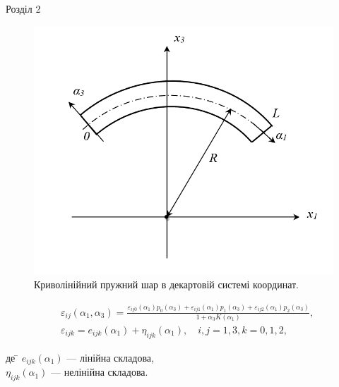 \documentclass[8pt]{beamer}
\numberwithin{figure}{section}
\numberwithin{equation}{section}
\numberwithin{table}{section}
\begin{document}
\begin{frame}{Розділ 2}
\begin{figure}
\includegraphics[scale=0.25]{pic/cylplate_2D.png}
\caption{Криволінійний пружний шар в декартовій системі координат.}
\end{figure}
\begin{equation}
\begin{aligned}
&\varepsilon_{ij} \left( \alpha_1, \alpha_3 \right) = \frac{\varepsilon_{ij0} \left( \alpha_1\right)p_0 \left( \alpha_3\right)+\varepsilon_{ij1} \left( \alpha_1\right)p_1 \left( \alpha_3\right)+\varepsilon_{ij2} \left( \alpha_1\right)p_2 \left( \alpha_3\right)}{1+\alpha_3 K\left( \alpha_1 \right)},\\
&\varepsilon_{ijk} = e_{ijk}\left( \alpha_1\right)+\eta_{ijk}\left( \alpha_1\right), \quad i,j=1,3, k=0,1,2,
\end{aligned}
\end{equation}

\begin{tabbing}
де \= $e_{ijk}\left( \alpha_1\right)$ --- лінійна складова,\\
\> $\eta_{ijk}\left( \alpha_1\right)$ --- нелінійна складова.
\end{tabbing}



\end{frame}
\end{document}
